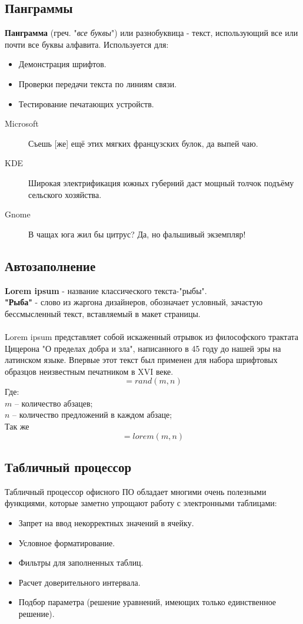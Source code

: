\subsection{Панграммы}
\textbf{Панграмма} (греч. "\emph{все буквы}") или разнобуквица - текст, использующий все или почти все буквы алфавита.
Используется для:
\begin{itemize}
  \item Демонстрация шрифтов.
  \item Проверки передачи текста по линиям связи.
  \item Тестирование печатающих устройств.
\end{itemize}
\begin{description}
  \item[Microsoft] Съешь [же] ещё этих мягких французских булок, да выпей чаю.
  \item[KDE] Широкая электрификация южных губерний даст мощный толчок подъёму сельского хозяйства.
  \item[Gnome] В чащах юга жил бы цитрус? Да, но фальшивый экземпляр!
\end{description}
\subsection{Автозаполнение}
\textbf{Lorem ipsum} - название классического текста-"рыбы".
\\\textbf{"Рыба"} - слово из жаргона дизайнеров, обозначает условный, зачастую бессмысленный текст, вставляемый в макет страницы.
\\
\\Lorem ipsum представляет собой искаженный отрывок из философского трактата Цицерона "О пределах добра и зла", написанного в 45 году до нашей эры на латинском языке. Впервые этот текст был применен для набора шрифтовых образцов неизвестным печатником в XVI веке.
\\
$$=rand(m, n)$$
Где:
\\$m$ – количество абзацев;
\\$n$ – количество предложений в каждом абзаце;
\\Так же
$$=lorem(m, n)$$
\subsection{Табличный процессор}
Табличный процессор офисного ПО обладает многими очень полезными функциями, которые заметно упрощают работу с электронными таблицами:
\begin{itemize}
  \item Запрет на ввод некорректных значений в ячейку.
  \item Условное форматирование.
  \item Фильтры для заполненных таблиц.
  \item Расчет доверительного интервала.
  \item Подбор параметра (решение уравнений, имеющих только единственное решение).
\end{itemize}
